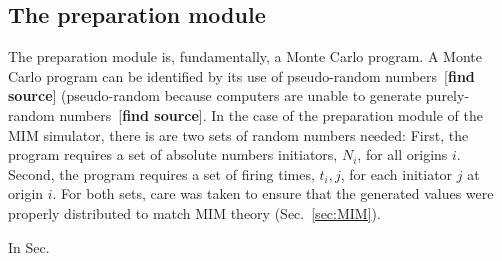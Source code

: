 	
		\subsection{The preparation module}
		
		The preparation module is, fundamentally, a Monte Carlo program.
		A Monte Carlo program can be identified by its use of pseudo-random numbers~[\textbf{find source}] (pseudo-random because computers are unable to generate purely-random numbers~[\textbf{find source}].
		In the case of the preparation module of the MIM simulator, there is are two sets of random numbers needed:
		First, the program requires a set of absolute numbers initiators, ${N_i}$, for all origins $i$.
		Second, the program requires a set of firing times, $t_i,j$, for each initiator $j$ at origin $i$.
		For both sets, care was taken to ensure that the generated values were properly distributed to match MIM theory (Sec.~\ref{sec:MIM}).
		
		In Sec.~\